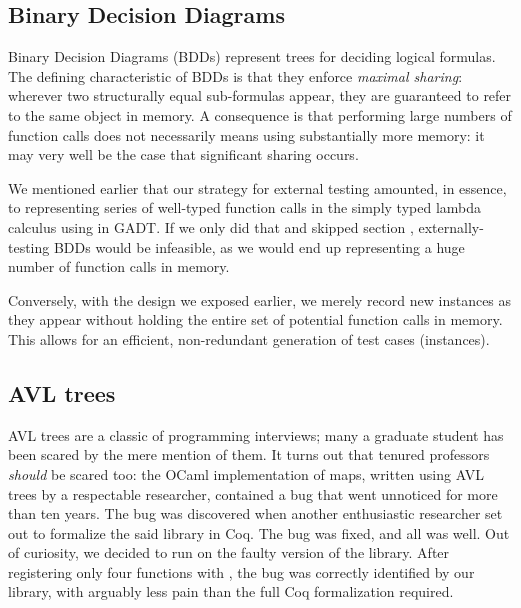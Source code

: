 \subsection{Binary Decision Diagrams}

Binary Decision Diagrams (BDDs) represent trees for deciding logical formulas. The
defining characteristic of BDDs is that they enforce \emph{maximal sharing}:
wherever two structurally equal sub-formulas appear, they are guaranteed to
refer to the same object in memory. A consequence is that performing large
numbers of function calls does not necessarily means using substantially more
memory: it may very well be the case that significant sharing occurs.

We mentioned earlier that our strategy for external testing amounted, in
essence, to representing series of well-typed function calls in the simply typed
lambda calculus using in GADT. If we only did that and skipped section
, externally-testing BDDs would be infeasible, as we
would end up representing a huge number of function calls in memory.

Conversely, with the design we exposed earlier, we merely record new instances
as they appear without holding the entire set of potential function calls in
memory. This allows for an efficient, non-redundant generation of test cases
(instances).

\subsection{AVL trees}

AVL trees are a classic of programming interviews; many a graduate
student has been scared by the mere mention of them. It turns out that tenured
professors \emph{should} be scared too: the OCaml implementation of maps,
written using AVL trees by a respectable researcher, contained a bug that went
unnoticed for more than ten years.
The bug was discovered when another enthusiastic researcher set out to formalize
the said library in Coq. The bug was fixed, and all was well. Out of curiosity,
we decided to run \arti on the faulty version of the library.
After registering only four functions with \arti, the bug was correctly
identified by our library, with arguably less pain than the full Coq
formalization required.


